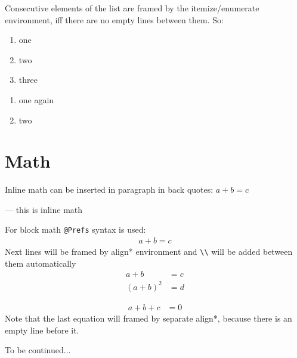\documentclass[12pt,a4paper,oneside]{article}
\begin{document}
    Consecutive elements of the list are framed by the itemize/enumerate environment,
    iff there are no empty lines between them. So:
    \begin{enumerate}
      \item one
      \item two
      \item three
    \end{enumerate}
    
    \begin{enumerate}
      \item one again
      \item two
    \end{enumerate}
  
  \section{Math}
    Inline math can be inserted in paragraph in back quotes: 
    $a + b = c$
     
    --- this is inline math
    
    For block math \texttt{@Prefs} syntax is used: 
    \begin{align*}
      a + b = c 
    \end{align*}
    Next lines will be framed by align* environment and \verb.\\. 
    will be added between them automatically
    \begin{align*}
      a + b     &= c\\
      (a + b)^2 &= d
    \end{align*}
    
    \begin{align*}
      a + b + c &= 0
    \end{align*}
    Note that the last equation will framed by separate align*, because
    there is an empty line before it. 
  
  To be continued... 
\end{document}
